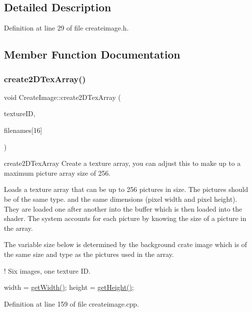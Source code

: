 \subsection{Detailed Description}


Definition at line 29 of file createimage.\+h.



\subsection{Member Function Documentation}
\mbox{\label{classCreateImage_a51bb6307d7b106aab55292813ef8b694}} 
\subsubsection{\texorpdfstring{create2\+D\+Tex\+Array()}{create2DTexArray()}}
{\footnotesize\ttfamily void Create\+Image\+::create2\+D\+Tex\+Array (\begin{DoxyParamCaption}\item[{G\+Luint \&}]{texture\+ID,  }\item[{string}]{filenames\mbox{[}16\mbox{]} }\end{DoxyParamCaption})}



create2\+D\+Tex\+Array Create a texture array, you can adjust this to make up to a maximum picture array size of 256. 

Loads a texture array that can be up to 256 pictures in size. The pictures should be of the same type. and the same dimensions (pixel width and pixel height). They are loaded one after another into the buffer which is then loaded into the shader. The system accounts for each picture by knowing the size of a picture in the array.

The variable size below is determined by the background crate image which is of the same size and type as the pictures used in the array.

! Six images, one texture ID.

width = \hyperlink{classCreateImage_ac0edbffce968346bd4c43564beb27c26}{get\+Width()}; height = \hyperlink{classCreateImage_abeb628a5f2fc67aeb1c39c1d0a445142}{get\+Height()}; 

Definition at line 159 of file createimage.\+cpp.

